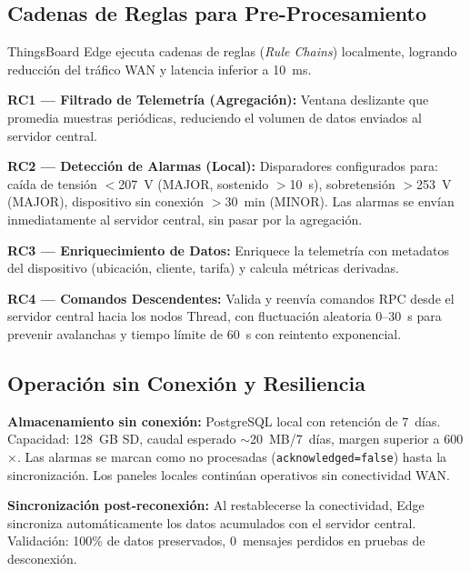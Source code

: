 \subsection{Cadenas de Reglas para Pre-Procesamiento}
\label{sec:gateway-tb-edge-rules}

ThingsBoard Edge ejecuta cadenas de reglas (\emph{Rule Chains}) localmente, logrando reducción del tráfico WAN y latencia inferior a 10~ms.

\textbf{RC1 --- Filtrado de Telemetría (Agregación):}  Ventana deslizante que promedia muestras periódicas, reduciendo el volumen de datos enviados al servidor central.

\textbf{RC2 --- Detección de Alarmas (Local):}  Disparadores configurados para: caída de tensión $<$207~V (MAJOR, sostenido $>$10~s), sobretensión $>$253~V (MAJOR), dispositivo sin conexión $>$30~min (MINOR).  Las alarmas se envían inmediatamente al servidor central, sin pasar por la agregación.

\textbf{RC3 --- Enriquecimiento de Datos:}  Enriquece la telemetría con metadatos del dispositivo (ubicación, cliente, tarifa) y calcula métricas derivadas.

\textbf{RC4 --- Comandos Descendentes:}  Valida y reenvía comandos RPC desde el servidor central hacia los nodos Thread, con fluctuación aleatoria 0--30~s para prevenir avalanchas y tiempo límite de 60~s con reintento exponencial.

\subsection{Operación sin Conexión y Resiliencia}
\label{sec:gateway-tb-edge-offline}

\textbf{Almacenamiento sin conexión:} PostgreSQL local con retención de 7~días.  Capacidad: 128~GB SD, caudal esperado $\sim$20~MB/7~días, margen superior a 600$\times$.  Las alarmas se marcan como no procesadas (\texttt{acknowledged=false}) hasta la sincronización.  Los paneles locales continúan operativos sin conectividad WAN.

\textbf{Sincronización post-reconexión:} Al restablecerse la conectividad, Edge sincroniza automáticamente los datos acumulados con el servidor central.  Validación: 100\% de datos preservados, 0~mensajes perdidos en pruebas de desconexión.

